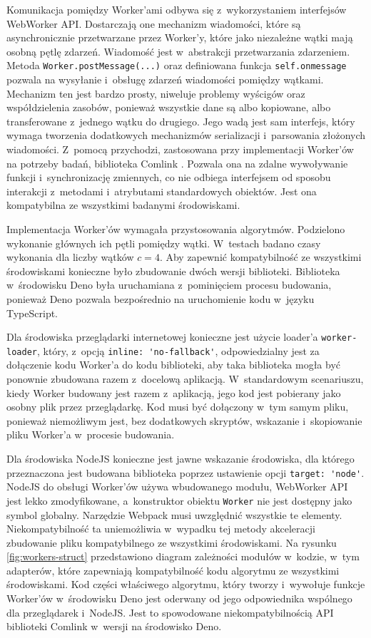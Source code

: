 Komunikacja pomiędzy Worker'ami odbywa się z~wykorzystaniem interfejsów WebWorker API. Dostarczają one mechanizm wiadomości, które są asynchronicznie przetwarzane przez Worker'y, które jako niezależne wątki mają osobną pętlę zdarzeń. Wiadomość jest w~abstrakcji przetwarzania zdarzeniem. Metoda \lstinline{Worker.postMessage(...)} oraz definiowana funkcja \lstinline{self.onmessage} pozwala na wysyłanie i~obsługę zdarzeń wiadomości pomiędzy wątkami. Mechanizm ten jest bardzo prosty, niweluje problemy wyścigów oraz współdzielenia zasobów, ponieważ wszystkie dane są albo kopiowane, albo transferowane z~jednego wątku do drugiego. Jego wadą jest sam interfejs, który wymaga tworzenia dodatkowych mechanizmów serializacji i~parsowania złożonych wiadomości. Z~pomocą przychodzi, zastosowana przy implementacji Worker'ów na potrzeby badań, biblioteka Comlink \cite{comlink}. Pozwala ona na zdalne wywoływanie funkcji i~synchronizację zmiennych, co nie odbiega interfejsem od sposobu interakcji z~metodami i~atrybutami standardowych obiektów. Jest ona kompatybilna ze wszystkimi badanymi środowiskami. 

Implementacja Worker'ów wymagała przystosowania algorytmów. Podzielono wykonanie głównych ich pętli pomiędzy wątki. W~testach badano czasy wykonania dla liczby wątków $c=4$. Aby zapewnić kompatybilność ze wszystkimi środowiskami konieczne było zbudowanie dwóch wersji biblioteki. Biblioteka w~środowisku Deno była uruchamiana z~pominięciem procesu budowania, ponieważ Deno pozwala bezpośrednio na uruchomienie kodu w~języku TypeScript. 

Dla środowiska przeglądarki internetowej konieczne jest użycie loader'a \lstinline{worker-loader}, który, z~opcją \lstinline{inline: 'no-fallback'}, odpowiedzialny jest za dołączenie kodu Worker'a do kodu biblioteki, aby taka biblioteka mogła być ponownie zbudowana razem z~docelową aplikacją. W~standardowym scenariuszu, kiedy Worker budowany jest razem z~aplikacją, jego kod jest pobierany jako osobny plik przez przeglądarkę. Kod musi być dołączony w~tym samym pliku, ponieważ niemożliwym jest, bez dodatkowych skryptów, wskazanie i~skopiowanie pliku Worker'a w~procesie budowania.

Dla środowiska NodeJS konieczne jest jawne wskazanie środowiska, dla którego przeznaczona jest budowana biblioteka poprzez ustawienie opcji \lstinline{target: 'node'}. NodeJS do obsługi Worker'ów używa wbudowanego modułu, WebWorker API jest lekko zmodyfikowane, a~konstruktor obiektu \lstinline{Worker} nie jest dostępny jako symbol globalny. Narzędzie Webpack musi uwzględnić wszystkie te elementy. Niekompatybilność ta uniemożliwia w~wypadku tej metody akceleracji zbudowanie pliku kompatybilnego ze wszystkimi środowiskami. Na rysunku \ref{fig:workers-struct} przedstawiono diagram zależności modułów w~kodzie, w~tym adapterów, które zapewniają kompatybilność kodu algorytmu ze wszystkimi środowiskami. Kod części właściwego algorytmu, który tworzy i~wywołuje funkcje Worker'ów w~środowisku Deno jest oderwany od jego odpowiednika wspólnego dla przeglądarek i~NodeJS. Jest to spowodowane niekompatybilnością API biblioteki Comlink w~wersji na środowisko Deno.

